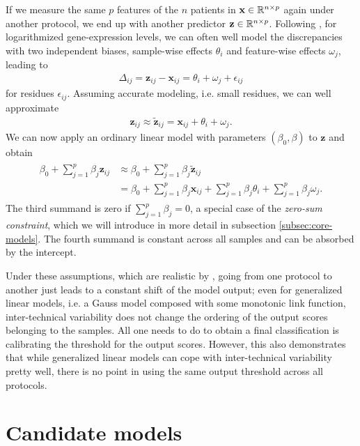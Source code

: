 If we 
measure the same $p$ features of the $n$ patients in $\mathbf{x} \in \mathbb{R}^{n \times p}$ again under 
another protocol, we end up with another predictor 
$\mathbf{z} \in \mathbb{R}^{n \times p}$.
Following \cite{transplatform17}, for logarithmized gene-expression levels,
we can often well model the discrepancies with two independent biases, sample-wise effects $\theta_i$
and feature-wise effects $\omega_j$, leading to
\begin{align}\label{eq:inter-tech-exact}
    \Delta_{ij} = \mathbf{z}_{ij} - \mathbf{x}_{ij} = \theta_i + \omega_j + \epsilon_{ij}
\end{align}
for residues $\epsilon_{ij}$. Assuming accurate modeling, i.e. small residues, we can well approximate
\begin{align}
    \mathbf{z}_{ij} \approx \tilde{\mathbf{z}}_{ij} = \mathbf{x}_{ij} + \theta_i + \omega_j.
\end{align}
We can now apply an ordinary linear model with parameters $(\beta_0, \beta)$ to $\mathbf{z}$ 
and obtain
\begin{align} \label{eq:inter-tech}
\begin{split}
    \beta_0 + \sum_{j=1}^p \beta_j \mathbf{z}_{ij} &\approx \beta_0 + \sum_{j=1}^p \beta_j \tilde{\mathbf{z}}_{ij} \\
    &= \beta_0 + \sum_{j=1}^p \beta_j \mathbf{x}_{ij} + \sum_{j=1}^p \beta_j \theta_i + \sum_{j=1}^p \beta_j \omega_j.
\end{split}
\end{align}
The third summand is zero if $\sum_{j = 1}^p \beta_j = 0$, a special case of the \textit{zero-sum 
constraint}, which we will introduce in more detail in subsection \ref{subsec:core-models}. 
The fourth summand is constant across all samples and can be absorbed by the intercept. 

Under these assumptions, which are realistic by \cite{transplatform17},
going from one protocol to another just leads to a constant shift of the model 
output; even for generalized linear models, i.e. a Gauss model composed with some monotonic link function,
inter-technical variability does not change the ordering of the output scores belonging to the 
samples. All one needs to do to 
obtain a final classification is calibrating the threshold for the output scores. However, this 
also demonstrates that while generalized linear models can cope with inter-technical variability 
pretty well, there is no point in using the same output threshold across all protocols.

\section{Candidate models}\label{sec:candidate-models}

